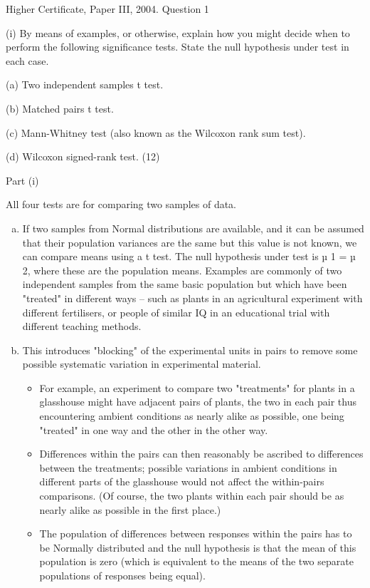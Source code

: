 \documentclass[a4paper,12pt]{article}
\begin{document}
Higher Certificate, Paper III, 2004.  Question 1 
 
\begin{framed}
  (i) By means of examples, or otherwise, explain how you might decide when to perform the following significance tests.  State the null hypothesis under test in each case. 
 
(a) Two independent samples t test. 
 
(b) Matched pairs t test. 
 
(c) Mann-Whitney test (also known as the Wilcoxon rank sum test). 
 
(d) Wilcoxon signed-rank test. 
(12) 
\end{framed}
Part (i) 
 
All four tests are for comparing two samples of data. 

\begin{enumerate}[(a)] 
\item If two samples from Normal distributions are available, and it can be assumed that their population variances are the same but this value is not known, we can compare means using a t test.  The null hypothesis under test is µ 1 = µ 2, where these are the population means. 
 Examples are commonly of two independent samples from the same basic population but which have been "treated" in different ways  –  such as plants in an agricultural experiment with different fertilisers, or people of similar IQ in an educational trial with different teaching methods. 

\item This introduces "blocking" of the experimental units in pairs to remove some possible systematic variation in experimental material. 
\begin{itemize}
    \item  For example, an experiment to compare two "treatments" for plants in a glasshouse might have adjacent pairs of plants, the two in each pair thus encountering ambient conditions as nearly alike as possible, one being "treated" in one way and the other in the other way.  
    \item Differences within the pairs can then reasonably be ascribed to differences between the treatments;  possible variations in ambient conditions in different parts of the glasshouse would not affect the within-pairs comparisons.  (Of course, the two plants within each pair should be as nearly alike as possible in the first place.)  
    \item The population of differences between responses within the pairs has to be Normally distributed and the null hypothesis is that the mean of this population is zero (which is equivalent to the means of the two separate populations of responses being equal). 
\end{itemize}


\end{enumerate}
\end{document}
